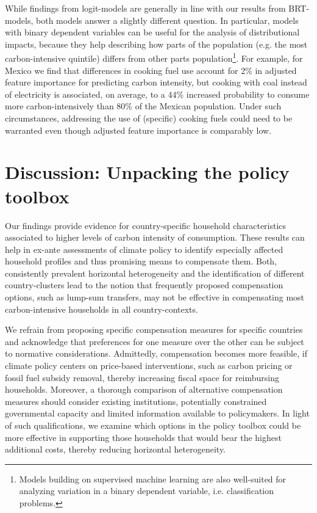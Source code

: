 \documentclass[12pt, a4paper]{article}
\begin{document}
While findings from logit-models are generally in line with our results from BRT-models, both models answer a slightly different question. In particular, models with binary dependent variables can be useful for the analysis of distributional impacts, because they help describing how parts of the population (e.g. the most carbon-intensive quintile) differs from other parts population\footnote{Models building on supervised machine learning are also well-suited for analyzing variation in a binary dependent variable, i.e. classification problems.}. For example, for Mexico we find that differences in cooking fuel use account for 2\% in adjusted feature importance for predicting carbon intensity, but cooking with coal instead of electricity is associated, on average, to a 44\% increased probability to consume more carbon-intensively than 80\% of the Mexican population. Under such circumstances, addressing the use of (specific) cooking fuels could need to be warranted even though adjusted feature importance is comparably low.

\section{Discussion: Unpacking the policy toolbox} \label{sec:discussion}

Our findings provide evidence for country-specific household characteristics associated to higher levels of carbon intensity of consumption. These results can help in ex-ante assessments of climate policy to identify especially affected household profiles and thus promising means to compensate them. Both, consistently prevalent horizontal heterogeneity and the identification of different country-clusters lead to the notion that frequently proposed compensation options, such as lump-sum transfers, may not be effective in compensating most carbon-intensive households in all country-contexts.

We refrain from proposing specific compensation measures for specific countries and acknowledge that preferences for one measure over the other can be subject to normative considerations. Admittedly, compensation becomes more feasible, if climate policy centers on price-based interventions, such as carbon pricing or fossil fuel subsidy removal, thereby increasing fiscal space for reimbursing households. Moreover, a thorough comparison of alternative compensation measures should consider existing institutions, potentially constrained governmental capacity and limited information available to policymakers. In light of such qualifications, we examine which options in the policy toolbox could be more effective in supporting those households that would bear the highest additional costs, thereby reducing horizontal heterogeneity.
\end{document}
